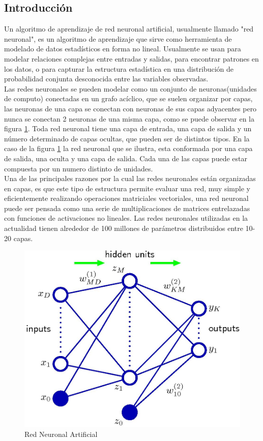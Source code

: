 \documentclass[a4paper,11pt,spanish]{book}
\begin{document}
      \subsection{Introducción}
	Un algoritmo de aprendizaje de red neuronal artificial, usualmente llamado "red neuronal", es un algoritmo de aprendizaje  que sirve como herramienta de modelado de datos 
	estadísticos en forma no lineal. Usualmente se usan para modelar relaciones complejas entre entradas y salidas,
	para encontrar patrones en los datos, o para capturar la estructura estadística en una distribución de probabilidad conjunta desconocida entre las variables observadas. \\
	Las redes neuronales se pueden modelar como un conjunto de neuronas(unidades de computo) conectadas en un grafo acíclico, que se suelen organizar por capas, las neuronas de una capa
	se conectan con neuronas de sus capas adyacentes pero nunca se conectan 2 neuronas de una misma capa, como se puede observar en la figura \ref{fig:neural_network}.
	Toda red neuronal tiene una capa de entrada, una capa de salida y un número determinado de capas ocultas, que pueden ser de distintos tipos. En la caso de la figura \ref{fig:neural_network}
	la red neuronal que se ilustra, esta conformada por una capa de salida, una oculta y una capa de salida. Cada una de las capas puede estar compuesta por un numero distinto de
	unidades.\\
	Una de las principales razones por la cual las redes neuronales están organizadas en capas, es que este tipo de estructura permite evaluar una red, muy simple y eficientemente realizando
	operaciones matriciales vectoriales, una red neuronal puede ser pensada como una serie de multiplicaciones de matrices entrelazadas con funciones de activaciones no lineales.
	Las redes neuronales utilizadas en la actualidad tienen alrededor de 100 millones de parámetros distribuidos entre 10-20 capas.
	\begin{figure}[H]
	  \begin{center}
	    \includegraphics[width=0.8\linewidth]{./img/bishop_neural_network.jpg}
	  \end{center}
	  \caption{Red Neuronal Artificial}
	  \label{fig:neural_network}
	\end{figure}
\end{document}
